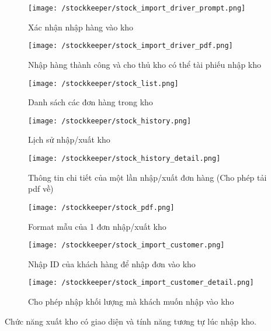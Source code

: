 				\begin{figure}[H]
					\texttt{[image: /stockkeeper/stock\_import\_driver\_prompt.png]}
					\centering
					\caption{Xác nhận nhập hàng vào kho}
				\end{figure}
			
				\begin{figure}[H]
					\texttt{[image: /stockkeeper/stock\_import\_driver\_pdf.png]}
					\centering
					\caption{Nhập hàng thành công và cho thủ kho có thể tài phiếu nhập kho}
				\end{figure}
			
				\begin{figure}[H]
					\texttt{[image: /stockkeeper/stock\_list.png]}
					\centering
					\caption{Danh sách các đơn hàng trong kho}
				\end{figure}
			
				\begin{figure}[H]
					\texttt{[image: /stockkeeper/stock\_history.png]}
					\centering
					\caption{Lịch sử nhập/xuất kho}
				\end{figure}
			
				\begin{figure}[H]
					\texttt{[image: /stockkeeper/stock\_history\_detail.png]}
					\centering
					\caption{Thông tin chi tiết của một lần nhập/xuất đơn hàng (Cho phép tải pdf về)}
				\end{figure}
			
				\begin{figure}[H]
					\texttt{[image: /stockkeeper/stock\_pdf.png]}
					\centering
					\caption{Format mẫu của 1 đơn nhập/xuất kho}
				\end{figure}
			
				\begin{figure}[H]
					\texttt{[image: /stockkeeper/stock\_import\_customer.png]}
					\centering
					\caption{Nhập ID của khách hàng để nhập đơn vào kho}
				\end{figure}
			
				\begin{figure}[H]
					\texttt{[image: /stockkeeper/stock\_import\_customer\_detail.png]}
					\centering
					\caption{Cho phép nhập khối lượng mà khách muốn nhập vào kho}
				\end{figure}
			
				Chức năng xuất kho có giao diện và tính năng tương tự lúc nhập kho.
				
